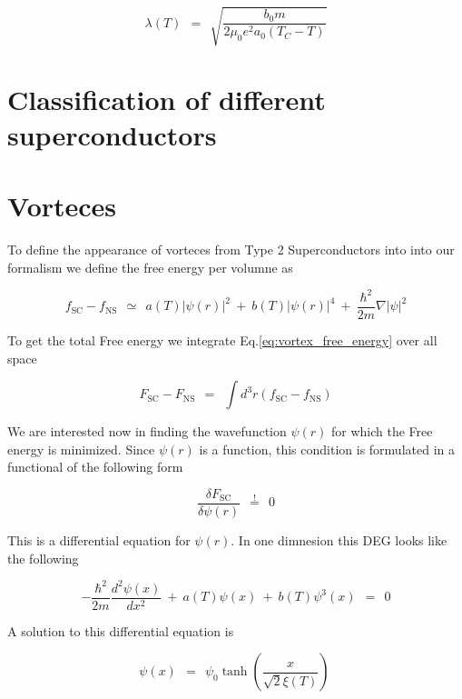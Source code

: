 \documentclass[10pt]{report}
\numberwithin{equation}{chapter}
\newcommand{\myEq}[1]{
  Eq.\ref{#1}
}
\begin{document}
\begin{equation} \label{eq:penetration_depth_temp_dep}
  \lambda(T) ~~=~~ \sqrt{\frac{b_0 m}{2 \mu_0 e^2 a_0 (T_C-T)}}
\end{equation}

\section{Classification of different superconductors}


\section{Vorteces}

To define the appearance of vorteces from Type 2 Superconductors into into our formalism we define the free energy per volumne as

\begin{equation} \label{eq:vortex_free_energy}
  f_\text{SC} - f_\text{NS} ~~≃~~ a(T) |\psi(r)|^2 ~+~ b(T)|\psi(r)|^4 ~+~ 
  \frac{\hbar^2}{2m} \nabla |\psi|^2
\end{equation}

To get the total Free energy we integrate \myEq{eq:vortex_free_energy} over all space

\begin{equation}
  F_\text{SC} - F_\text{NS} ~~=~~ \int d^3r (f_\text{SC} - f_\text{NS})
\end{equation}

We are interested now in finding the wavefunction $\psi(r)$ for which the Free energy is minimized. Since $\psi(r)$ is a function, this condition is formulated in a functional of the following form

\begin{equation}
  \frac{\delta F_\text{SC}}{\delta \psi(r)} ~~\overset{!}{=}~~ 0
\end{equation}

This is a differential equation for $\psi(r)$. In one dimnesion this DEG looks like the following

\begin{equation} \label{eq:vortex_wave_function_deg}
  -\frac{\hbar^2}{2m} \frac{d^2\psi(x)}{dx^2} ~+~ a(T) \psi(x) ~+~ b(T) \psi^3(x) ~~=~~ 0
\end{equation}

A solution to this differential equation is

\begin{equation} \label{eq:vortex_wave_function}
  \psi(x) ~~=~~ \psi_0 \tanh(\frac{x}{\sqrt{2} \xi(T)})
  \ 
\end{equation}
\end{document}

